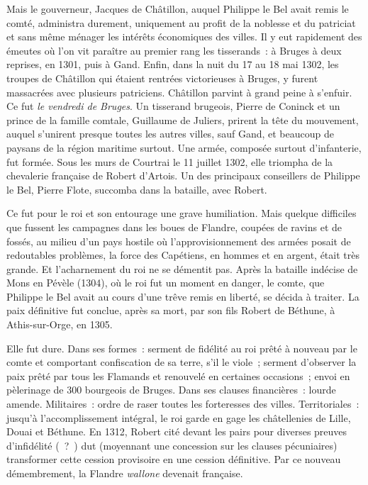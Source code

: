 \documentclass[french,twoside]{book} %
\begin{document}
Mais le gouverneur, Jacques de Châtillon, auquel Philippe le Bel avait remis le comté, administra durement, uniquement au profit de la noblesse et du patriciat et sans même ménager les intérêts économiques des villes. Il y eut rapidement des émeutes où l’on vit paraître au premier rang les tisserands : à Bruges à deux reprises, en 1301, puis à Gand. Enfin, dans la nuit du 17 au 18 mai 1302, les troupes de Châtillon qui étaient rentrées victorieuses à Bruges, y furent massacrées avec plusieurs patriciens. Châtillon parvint à grand peine à s’enfuir. Ce fut \emph{le vendredi de Bruges}. Un tisserand brugeois, Pierre de Coninck et un prince de la famille comtale, Guillaume de Juliers, prirent la tête du mouvement, auquel s’unirent presque toutes les autres villes, sauf Gand, et beaucoup de paysans de la région maritime surtout. Une armée, composée surtout d’infanterie, fut formée. Sous les murs de Courtrai le 11 juillet 1302, elle triompha de la chevalerie française de Robert d’Artois. Un des principaux conseillers de Philippe le Bel, Pierre Flote, succomba dans la bataille, avec Robert.\par
Ce fut pour le roi et son entourage une grave humiliation. Mais quelque difficiles que fussent les campagnes dans les boues de Flandre, coupées de ravins et de fossés, au milieu d’un pays hostile où l’approvisionnement des armées posait de redoutables problèmes, la force des Capétiens, en hommes et en argent, était très grande. Et l’acharnement du roi ne se démentit pas. Après la bataille indécise de Mons en Pévèle (1304), où le roi fut un moment en danger, le comte, que Philippe le Bel avait au cours d’une trêve remis en liberté, se décida à traiter. La paix définitive fut conclue, après sa mort, par son fils Robert de Béthune, à Athis-sur-Orge, en 1305.\par
Elle fut dure. Dans ses formes : serment de fidélité au roi prêté à nouveau par le comte et comportant confiscation de sa terre, s’il le viole ; serment d’observer la paix prêté par tous les Flamands et renouvelé en certaines occasions ; envoi en pèlerinage de 300 bourgeois de Bruges. Dans ses clauses financières : lourde amende. Militaires : ordre de raser toutes les forteresses des villes. Territoriales : jusqu’à l’accomplissement intégral, le roi garde en gage les châtellenies de Lille, Douai et Béthune. En 1312, Robert cité devant les pairs pour diverses preuves d’infidélité ( ? ) dut (moyennant une concession sur les clauses pécuniaires) transformer cette cession provisoire en une cession définitive. Par ce nouveau démembrement, la Flandre \emph{wallone} devenait française.\par
\end{document}
